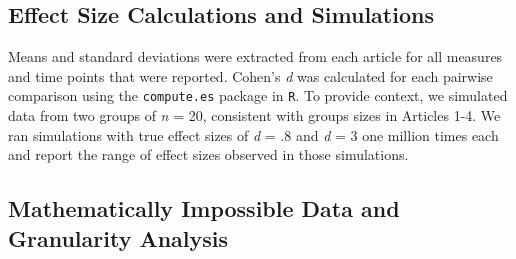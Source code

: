 \documentclass[
  english,
  man,floatsintext]{apa7}
\begin{document}
\hypertarget{effect-size-calculations-and-simulations}{%
\subsection{Effect Size Calculations and Simulations}\label{effect-size-calculations-and-simulations}}

Means and standard deviations were extracted from each article for all measures and time points that were reported. Cohen's \emph{d} was calculated for each pairwise comparison using the \texttt{compute.es} package in \texttt{R}. To provide context, we simulated data from two groups of \emph{n} = 20, consistent with groups sizes in Articles 1-4. We ran simulations with true effect sizes of \emph{d} = .8 and \emph{d} = 3 one million times each and report the range of effect sizes observed in those simulations.

\hypertarget{mathematically-impossible-data-and-granularity-analysis}{%
\subsection{Mathematically Impossible Data and Granularity Analysis}\label{mathematically-impossible-data-and-granularity-analysis}}
\end{document}

